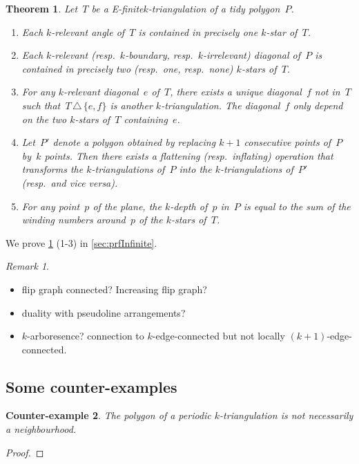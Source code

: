 \documentclass{amsart}
\newtheorem{theorem}{Theorem}[section]
\newtheorem{ce}[theorem]{Counter-example}
\theoremstyle{remark}
\newtheorem{remark}{Remark}[section]
\newcommand{\symdif}{\,\triangle\,} %
\newcommand{\viceversa}{\textit{vice versa}} %
\newcommand*{\nbd}[0]{neighbourhood\xspace}
\newcommand*{\ef}[0]{E-finite\xspace}
\newcommand*{\ktg}[0]{$k$-triangulation\xspace}
\newcommand{\vincent}[1]{\todo[color=blue!30]{#1 \\ \hfill --- V.}}
\begin{document}
\begin{theorem}
\label{thm:structureInfinite}
Let~$T$ be a \ef \ktg of a tidy polygon~$P$.
\begin{enumerate}
\item Each $k$-relevant angle of~$T$ is contained in precisely one $k$-star of~$T$.
\item Each $k$-relevant (resp.~$k$-boundary, resp.~$k$-irrelevant) diagonal of~$P$ is contained in precisely two (resp.~one, resp.~none) $k$-stars of~$T$.
\item For any $k$-relevant diagonal~$e$ of~$T$, there exists a unique diagonal~$f$ not in~$T$ such that~$T \symdif \{e,f\}$ is another $k$-triangulation. The diagonal~$f$ only depend on the two $k$-stars of~$T$ containing~$e$.
\item Let~$P'$ denote a polygon obtained by replacing $k+1$ consecutive points of~$P$ by~$k$ points. Then there exists a flattening (resp.~inflating) operation that transforms the \ktg{}s of~$P$ into the \ktg{}s of~$P'$ (resp.~and \viceversa).
\item For any point~$p$ of the plane, the $k$-depth of~$p$ in~$P$ is equal to the sum of the winding numbers around~$p$ of the $k$-stars of~$T$.
\vincent{Vrai ?}
\end{enumerate}
\end{theorem}

We prove \cref{thm:structureInfinite} (1-3) in \cref{sec:prfInfinite}.

\begin{remark}
\begin{itemize}
\item flip graph connected? Increasing flip graph?
\item duality with pseudoline arrangements?
\item $k$-arboresence? connection to $k$-edge-connected but not locally $(k+1)$-edge-connected.
\end{itemize}
\end{remark}


\subsection{Some counter-examples}

\begin{ce}
The polygon of a periodic \ktg is not necessarily a \nbd.
\end{ce}
\begin{proof}

\end{proof}
\end{document}
